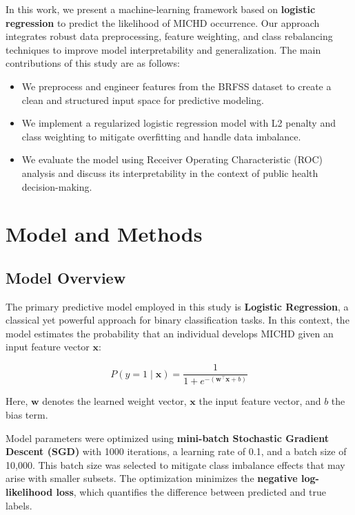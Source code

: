 \documentclass[twocolumn]{article}
\begin{document}
In this work, we present a machine-learning framework based on \textbf{logistic regression} to predict the likelihood of MICHD occurrence. Our approach integrates robust data preprocessing, feature weighting, and class rebalancing techniques to improve model interpretability and generalization. The main contributions of this study are as follows:
\begin{itemize}
    \item We preprocess and engineer features from the BRFSS dataset to create a clean and structured input space for predictive modeling.
    \item We implement a regularized logistic regression model with L2 penalty and class weighting to mitigate overfitting and handle data imbalance.
    \item We evaluate the model using Receiver Operating Characteristic (ROC) analysis and discuss its interpretability in the context of public health decision-making.
\end{itemize}


\section{Model and Methods}

\subsection{Model Overview}
The primary predictive model employed in this study is \textbf{Logistic Regression}, a classical yet powerful approach for binary classification tasks. In this context, the model estimates the probability that an individual develops MICHD given an input feature vector $\bm{x}$:

\begin{equation}
P(y = 1 \mid \bm{x}) = \frac{1}{1 + e^{-(\bm{w}^\top \bm{x} + b)}}
\end{equation}

Here, $\bm{w}$ denotes the learned weight vector, $\bm{x}$ the input feature vector, and $b$ the bias term.

Model parameters were optimized using \textbf{mini-batch Stochastic Gradient Descent (SGD)} with 1000 iterations, a learning rate of 0.1, and a batch size of 10,000. This batch size was selected to mitigate class imbalance effects that may arise with smaller subsets. The optimization minimizes the \textbf{negative log-likelihood loss}, which quantifies the difference between predicted and true labels.
\end{document}
